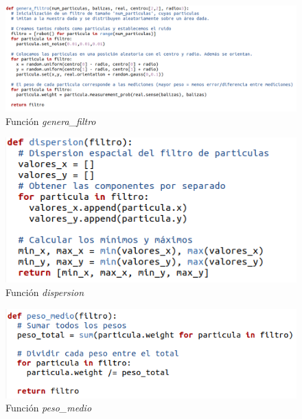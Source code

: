 \begin{figure}[htb]
  \centering
  \includegraphics[width=1\linewidth]{images/filtroc1.png}
  \caption{Función \textit{genera\_filtro}}
  \label{fig:genera_filtro}
\end{figure}
\begin{figure}[htb]
  \centering
  \includegraphics[width=.5\linewidth]{images/filtroc2.png}
  \caption{Función \textit{dispersion}}
  \label{fig:dispersion}
\end{figure}
\begin{figure}[htb]
  \centering
  \includegraphics[width=.6\linewidth]{images/filtroc3.png}
  \caption{Función \textit{peso\_medio}}
  \label{fig:peso_medio}
\end{figure}

